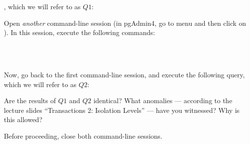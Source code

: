 \vgap

\noindent {}, which we will refer to as $Q1$:

\vgap

\noindent {}

\vgap

\noindent Open {\em another} command-line session (in pgAdmin4, go to menu  and then click on ). In this session, execute the following commands:

\vgap

\noindent {}  \\
\noindent {}  \\
\noindent {}

\vgap

\noindent Now, go back to the first command-line session, and execute the following query, which we will refer to as $Q2$:

\vgap

\noindent {}

\vgap

\noindent Are the results of $Q1$ and $Q2$ identical? What anomalies --- according to the lecture slides ``Transactions 2:
Isolation Levels'' --- have you witnessed? Why is this allowed?

\vgap

\noindent Before proceeding, close both command-line sessions.







